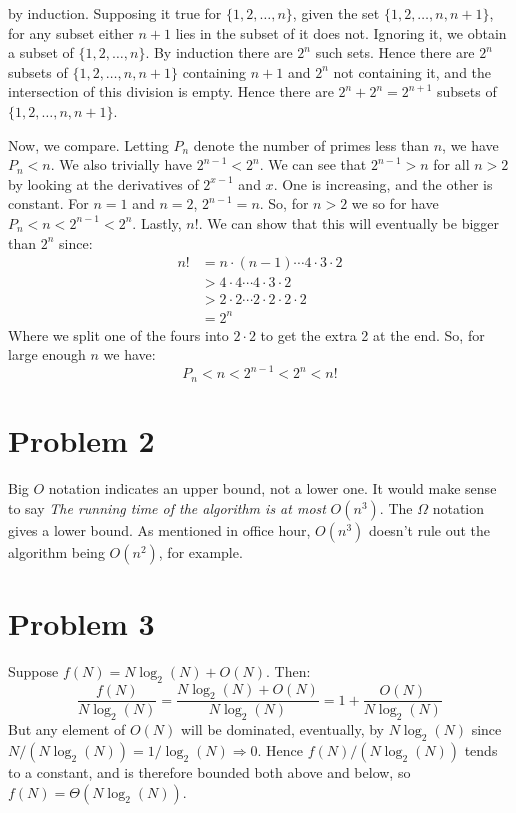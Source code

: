 \documentclass{article}
\begin{document}
        by induction. Supposing it true for $\{1,2,\dots,n\}$, given the set
        $\{1,2,\dots,n,n+1\}$, for any subset either $n+1$ lies in the subset of it does not.
        Ignoring it, we obtain a subset of $\{1,2,\dots,n\}$. By induction there are
        $2^{n}$ such sets. Hence there are $2^{n}$ subsets of $\{1,2,\dots,n,n+1\}$
        containing $n+1$ and $2^{n}$ not containing it, and the intersection of this
        division is empty. Hence there are $2^{n}+2^{n}=2^{n+1}$ subsets of
        $\{1,2,\dots,n,n+1\}$.
        \par\hfill\par\noindent
        Now, we compare. Letting $P_{n}$ denote the number of primes less than $n$, we have
        $P_{n}<n$. We also trivially have $2^{n-1}<2^{n}$. We can see that $2^{n-1}>n$ for all
        $n>2$ by looking at the derivatives of $2^{x-1}$ and $x$. One is increasing, and the
        other is constant. For $n=1$ and $n=2$, $2^{n-1}=n$. So, for $n>2$ we so for have
        $P_{n}<n<2^{n-1}<2^{n}$. Lastly, $n!$. We can show that this will eventually be bigger
        than $2^{n}$ since:
        \begin{subequations}
            \begin{align}
                n!&=n\cdot(n-1)\cdots{4}\cdot{3}\cdot{2}\\
                  &>4\cdot{4}\cdots{4}\cdot{3}\cdot{2}\\
                  &>2\cdot{2}\cdots{2}\cdot{2}\cdot{2}\cdot{2}\\
                  &=2^{n}
            \end{align}
        \end{subequations}
        Where we split one of the fours into $2\cdot{2}$ to get the extra 2 at the end.
        So, for large enough $n$ we have:
        \begin{equation}
            P_{n}<n<2^{n-1}<2^{n}<n!
        \end{equation}
    \section*{Problem 2}
        Big $O$ notation indicates an upper bound, not a lower one.
        It would make sense to say \textit{The running time of the algorithm is at most}
        $O(n^{3})$. The $\Omega$ notation gives a lower bound. As mentioned in office hour,
        $O(n^{3})$ doesn't rule out the algorithm being $O(n^{2})$, for example.
    \section*{Problem 3}
        Suppose $f(N)=N\log_{2}(N)+O(N)$. Then:
        \begin{equation}
            \frac{f(N)}{N\log_{2}(N)}=\frac{N\log_{2}(N)+O(N)}{N\log_{2}(N)}
            =1+\frac{O(N)}{N\log_{2}(N)}
        \end{equation}
        But any element of $O(N)$ will be dominated, eventually, by $N\log_{2}(N)$ since 
        $N/(N\log_{2}(N))=1/\log_{2}(N)\Rightarrow{0}$. Hence $f(N)/(N\log_{2}(N))$
        tends to a constant, and is therefore bounded both above and below, so
        $f(N)=\Theta(N\log_{2}(N))$.
\end{document}
